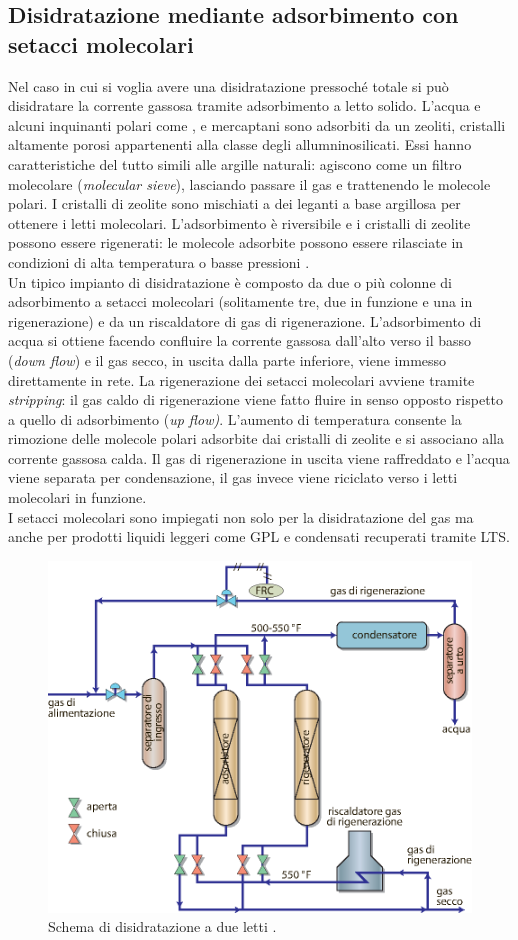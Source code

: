 \subsection{Disidratazione mediante adsorbimento con setacci molecolari}
Nel caso in cui si voglia avere una disidratazione pressoché totale si può disidratare la corrente gassosa tramite adsorbimento a letto solido. L'acqua e alcuni inquinanti polari come ,  e mercaptani sono adsorbiti da un zeoliti, cristalli altamente porosi appartenenti alla classe degli allumninosilicati. Essi hanno caratteristiche del tutto simili alle argille naturali: agiscono come un filtro molecolare (\textit{molecular sieve}), lasciando passare il gas e trattenendo le molecole polari. I cristalli di zeolite sono mischiati a dei leganti a base argillosa per ottenere i letti molecolari. L'adsorbimento è riversibile e i cristalli di zeolite possono essere rigenerati: le molecole adsorbite possono essere rilasciate in condizioni di alta temperatura o basse pressioni \parencite{grace2010techinf}. \\
Un tipico impianto di disidratazione è composto da due o più colonne di adsorbimento a setacci molecolari (solitamente tre, due in funzione e una in rigenerazione) e da un riscaldatore di gas di rigenerazione. L'adsorbimento di acqua si ottiene facendo confluire la corrente gassosa dall'alto verso il basso (\textit{down flow}) e il gas secco, in uscita dalla parte inferiore, viene immesso direttamente in rete. La rigenerazione dei setacci molecolari avviene tramite \textit{stripping}: il gas caldo di rigenerazione viene fatto fluire in senso opposto rispetto a quello di adsorbimento (\textit{up flow)}. L'aumento di temperatura consente la rimozione delle molecole polari adsorbite dai cristalli di zeolite e si associano alla corrente gassosa calda. Il gas di rigenerazione in uscita viene raffreddato e l'acqua viene separata per condensazione, il gas invece viene riciclato verso i letti molecolari in funzione.\\
I setacci molecolari sono impiegati non solo per la disidratazione del gas ma anche per prodotti liquidi leggeri come GPL e condensati recuperati tramite LTS.

\begin{figure}[htbp]
    \centering
    \includegraphics[width=.7\textwidth]{fig/impianti/molecularsieve.eps}
    \caption{Schema di disidratazione a due letti \parencite{bianco2005impiantigas}.}
    \label{fig:molecularsieve}
\end{figure}

